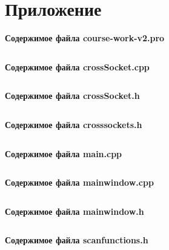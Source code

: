 \section{Приложение}
\textbf{Содержимое файла course-work-v2.pro}
\inputminted{idl}{source/course-work-v2.pro}
\textbf{Содержимое файла crossSocket.cpp}
\inputminted{cpp}{source/crossSocket.cpp}
\textbf{Содержимое файла crossSocket.h}
\inputminted{c}{source/crossSocket.h}
\textbf{Содержимое файла crosssockets.h}
\inputminted{c}{source/crosssockets.h}
\textbf{Содержимое файла main.cpp}
\inputminted{cpp}{source/main.cpp}
\textbf{Содержимое файла mainwindow.cpp}
\inputminted{cpp}{source/mainwindow.cpp}
\textbf{Содержимое файла mainwindow.h}
\inputminted{c}{source/mainwindow.h}
\textbf{Содержимое файла scanfunctions.h}
\inputminted{c}{source/scanfunctions.h}
